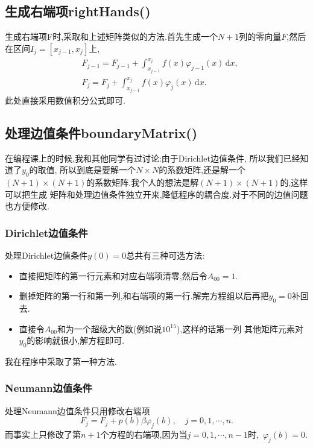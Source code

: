 \documentclass[11pt,reqno]{article}
\numberwithin{equation}{section}
\renewcommand{\d}{\,\mathrm d}
\begin{document}
\subsection{生成右端项rightHands()}
生成右端项F时,采取和上述矩阵类似的方法.首先生成一个$N+1$列的零向量$F$,然后
在区间$I_j=[x_{j-1},x_j]$上,
\begin{equation}
	\begin{split}
		&F_{j-1}=F_{j-1}+\int_{x_{j-1}}^{x_j}f(x)\varphi_{j-1}(x)\d x,\\
		&F_{j}=F_{j}+\int_{x_{j-1}}^{x_j}f(x)\varphi_{j}(x)\d x.
	\end{split}
\end{equation}
此处直接采用数值积分公式即可.

\subsection{处理边值条件boundaryMatrix()}
在编程课上的时候,我和其他同学有过讨论:由于Dirichlet边值条件,
所以我们已经知道了$y_0$的取值, 所以到底是要解一个$N\times N$的系数矩阵,还是解一个
$(N+1)\times(N+1)$的系数矩阵.我个人的想法是解$(N+1)\times(N+1)$的,这样可以把生成
矩阵和处理边值条件独立开来,降低程序的耦合度.对于不同的边值问题也方便修改.

\subsubsection{Dirichlet边值条件}
处理Dirichlet边值条件$y(0)=0$总共有三种可选方法:
\begin{itemize}
	\item 直接把矩阵的第一行元素和对应右端项清零,然后令$A_{00}=1.$
	\item 删掉矩阵的第一行和第一列,和右端项的第一行.解完方程组以后再把$y_0=0$补回去.
	\item 直接令$A_{00}$和为一个超级大的数(例如说$10^{15}$),这样的话第一列
	其他矩阵元素对$y_0$的影响就很小,解方程即可.
\end{itemize}
我在程序中采取了第一种方法.

\subsubsection{Neumann边值条件}
处理Neumann边值条件只用修改右端项
\begin{equation}
	F_j=F_j+p(b)\beta\varphi_j(b),\quad j=0,1,\cdots,n.
\end{equation}
而事实上只修改了第$n+1$个方程的右端项,因为当$j=0,1,\cdots,n-1$时,\ $\varphi_{j}(b)=0.$
\end{document}
